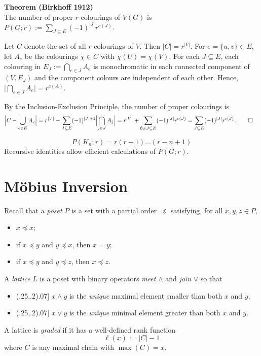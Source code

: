 \documentclass[a4paper]{article}
\let\oldendproof\endproof
\renewenvironment{proof}[1][\proofname]{%
  \oldproof[\scshape \noindent {\bfseries \text{Proof}}]%
}{\oldendproof}
\newenvironment{myitemize}
{\vspace*{-1mm}
 \begin{itemize}
    \setlength{\itemsep}{1pt}
    \setlength{\parskip}{1pt}
    \setlength{\parsep}{0pt}}
{\end{itemize}
 \vspace*{-1mm}}
\newcommand{\example} {\bigskip\noindent{\bf Example.}\;\;}
\newcommand{\definition}{\bigskip\noindent{\bf Definition.}\;\;}
\newenvironment{thm}[1]{
	\begin{framed}
	\noindent
	{\bfseries #1}\\}{\setlength{\itemsep}{0pt}
	\end{framed}
}
\newcommand{\abs}[1]{\Bigl| #1 \Bigr|}
\newcommand{\mybullet}{\psset{unit=6mm,dotscale=1.5,linewidth=.05,fillcolor=black,linecolor=black,framearc=.3,shadow=true}
  \pspicture(-.3,0)(.8,.4)\qdisk(.25,.2){.1}\pscircle*[linecolor=gray](.25,.2){.07}\endpspicture}
\newcommand{\ds}{\displaystyle}
\begin{document}
\begin{thm}{Theorem (Birkhoff 1912)}
The number of proper $r$-colourings of $V(G)$ is $\ds P(G;r):= \sum_{J \subseteq E}
(-1)^{|J|} r^{c(J)}$.
\end{thm}

\begin{proof}
Let $C$ denote the set of all $r$-colourings of $V$.
Then $|C| = r^{|V|}$.
For $e = \{u,v\} \in E$, let $A_e$ be the colourings $\chi \in C$ with $\chi(U) =
\chi(V)$.
For each $J \subseteq E$, each colouring in $E_J:= \bigcap_{e \in J} A_e$ is monochromatic
in each
connected component of $(V, E_J)$ and the component colours are independent of each other.
Hence, $\bigl|\bigcap_{e \in J} A_e\bigr| = r^{c(A)}$.

By the Inclusion-Exclusion Principle, the number of proper colourings is
\begin{align*}
	\abs{C - \bigcup_{e \in E} A_e}
 & = r^{|V|} - \sum_{J \subseteq E} (-1)^{|J|+1}\abs{\bigcap_{j \in J} A_j}
   = r^{|V|} + \sum_{\emptyset \neq J \subseteq E} (-1)^{|J|} r^{c(J)}
   = \sum_{J \subseteq E} (-1)^{|J|} r^{c(J)}\,.\qedhere
\end{align*}
\end{proof}

\example
\[ P(K_n; r) = r(r-1)\dots(r-n+1)\]
Recursive identities allow efficient calculations of $P(G;r)$.



\section*{M\"obius Inversion}

Recall that a \emph{poset} $P$ is a set with a partial order $\preceq$ satisfying, for all
$x,y,z \in P$,
\begin{myitemize}
  \item[{(R)}] $x \preceq x$;
  \item[{(A)}] if $x \preceq y$ and $y \preceq x$, then $x = y$;
  \item[{(T)}] if $x \preceq y$ and $y \preceq z$, then $x \preceq z$.
\end{myitemize}

\definition
A \emph{lattice} $L$ is a poset with binary operators \emph{meet} $\wedge$ and \emph{join}
$\vee$ so that
\begin{myitemize}
	\item[\mybullet] $x \wedge y$ is the \emph{unique} maximal element smaller than both
$x$ and $y$.
	\item[\mybullet] $x \vee   y$ is the \emph{unique} minimal element greater than both
$x$ and $y$.
\end{myitemize}
A lattice is \emph{graded} if it has a well-defined rank function
	\[ \ell(x) := |C| - 1\]
where $C$ is any maximal chain with $\max(C) = x$.
\end{document}
